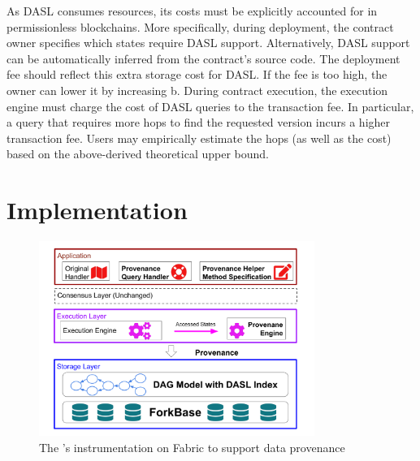 As DASL consumes resources, its costs must be explicitly accounted for in permissionless blockchains.
More specifically, during deployment, the contract owner specifies which states require DASL support.
Alternatively, DASL support can be automatically inferred from the contract's source code. The deployment fee
should reflect this extra storage cost for DASL. If the fee is too high, the owner can lower it by increasing
b. During contract execution, the execution engine must charge the cost of DASL queries to the transaction
fee. In particular, a query that requires more hops to find the requested version incurs a higher transaction
fee. Users may empirically estimate the hops (as well as the cost) based on the above-derived theoretical upper bound. 

\section{Implementation}
\label{sec:provenance:implementation}
\begin{figure}
  \centering
  \includegraphics[width=0.8\textwidth]{diagram/provenance/lineagechain.pdf}
  \caption{The {\fs}'s instrumentation on Fabric to support data provenance }
  \label{diagram:prov:arch} 
\end{figure}

